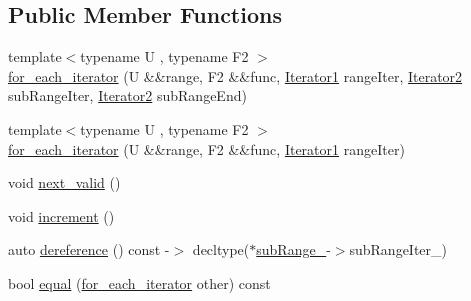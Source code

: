 \subsection*{Public Member Functions}
\begin{DoxyCompactItemize}
\item 
{\footnotesize template$<$typename U , typename F2 $>$ }\\\mbox{\hyperlink{structrah_1_1view_1_1for__each__iterator_a99d35e874f60eb4765142153ade5f261}{for\+\_\+each\+\_\+iterator}} (U \&\&range, F2 \&\&func, \mbox{\hyperlink{structrah_1_1view_1_1for__each__iterator_a173ab775f95bdff3b3756714690be546}{Iterator1}} range\+Iter, \mbox{\hyperlink{structrah_1_1view_1_1for__each__iterator_a13108a8db132a8157375f81cf9b12ce1}{Iterator2}} sub\+Range\+Iter, \mbox{\hyperlink{structrah_1_1view_1_1for__each__iterator_a13108a8db132a8157375f81cf9b12ce1}{Iterator2}} sub\+Range\+End)
\item 
{\footnotesize template$<$typename U , typename F2 $>$ }\\\mbox{\hyperlink{structrah_1_1view_1_1for__each__iterator_ada9b50f658aad410159d9147b1962595}{for\+\_\+each\+\_\+iterator}} (U \&\&range, F2 \&\&func, \mbox{\hyperlink{structrah_1_1view_1_1for__each__iterator_a173ab775f95bdff3b3756714690be546}{Iterator1}} range\+Iter)
\item 
void \mbox{\hyperlink{structrah_1_1view_1_1for__each__iterator_a7651c890dd6d935f617c8f0565f8c6f3}{next\+\_\+valid}} ()
\item 
void \mbox{\hyperlink{structrah_1_1view_1_1for__each__iterator_aff4bef7aa6d6e667d2b364bb4e0108f7}{increment}} ()
\item 
auto \mbox{\hyperlink{structrah_1_1view_1_1for__each__iterator_a9204ed8495c7cb031758e53e4b451f4f}{dereference}} () const -\/$>$ decltype($\ast$\mbox{\hyperlink{structrah_1_1view_1_1for__each__iterator_a51f880dad745bc5fc0f5de78353ceb90}{sub\+Range\+\_\+}}-\/$>$sub\+Range\+Iter\+\_\+)
\item 
bool \mbox{\hyperlink{structrah_1_1view_1_1for__each__iterator_a233240f479d09d32295d6a244895485c}{equal}} (\mbox{\hyperlink{structrah_1_1view_1_1for__each__iterator}{for\+\_\+each\+\_\+iterator}} other) const
\end{DoxyCompactItemize}
